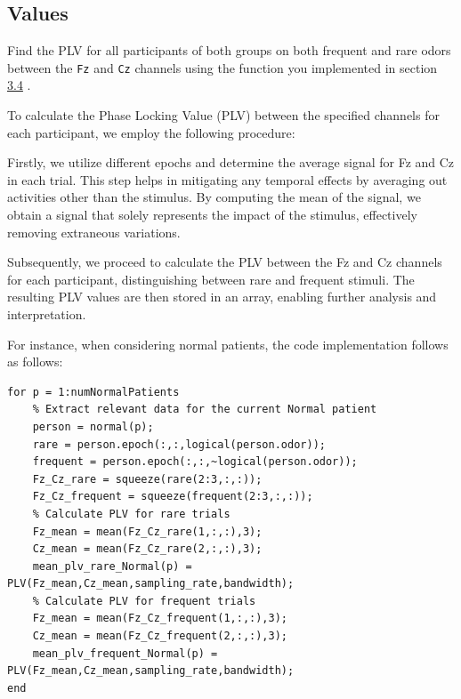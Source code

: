 \documentclass[12pt]{article}
\begin{document}
\subsection{Values} Find the PLV for all participants of both groups on both frequent and rare odors between the \texttt{Fz} and \texttt{Cz} channels using the function you implemented in section \hyperref[sec:3.4]{3.4} . \begin{qsolve}[]
	To calculate the Phase Locking Value (PLV) between the specified channels for each participant, we employ the following procedure:

	Firstly, we utilize different epochs and determine the average signal for Fz and Cz in each trial. This step helps in mitigating any temporal effects by averaging out activities other than the stimulus. By computing the mean of the signal, we obtain a signal that solely represents the impact of the stimulus, effectively removing extraneous variations.

	Subsequently, we proceed to calculate the PLV between the Fz and Cz channels for each participant, distinguishing between rare and frequent stimuli. The resulting PLV values are then stored in an array, enabling further analysis and interpretation.

	For instance, when considering normal patients, the code implementation follows as follows:
\end{qsolve}
\begin{lstlisting}[style=matlab-editor,basicstyle=\small]
for p = 1:numNormalPatients
    % Extract relevant data for the current Normal patient
    person = normal(p);
    rare = person.epoch(:,:,logical(person.odor));
    frequent = person.epoch(:,:,~logical(person.odor));
    Fz_Cz_rare = squeeze(rare(2:3,:,:));
    Fz_Cz_frequent = squeeze(frequent(2:3,:,:));
    % Calculate PLV for rare trials
    Fz_mean = mean(Fz_Cz_rare(1,:,:),3);
    Cz_mean = mean(Fz_Cz_rare(2,:,:),3);
    mean_plv_rare_Normal(p) = PLV(Fz_mean,Cz_mean,sampling_rate,bandwidth);
    % Calculate PLV for frequent trials
    Fz_mean = mean(Fz_Cz_frequent(1,:,:),3);
    Cz_mean = mean(Fz_Cz_frequent(2,:,:),3);
    mean_plv_frequent_Normal(p) = PLV(Fz_mean,Cz_mean,sampling_rate,bandwidth);
end\end{lstlisting}
\medskip
\end{document}
